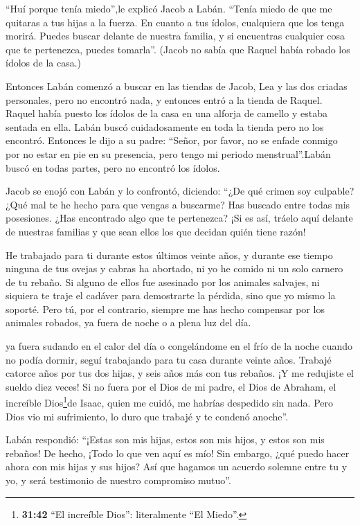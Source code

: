  ``Huí porque tenía miedo'',le explicó Jacob a Labán.
``Tenía miedo de que me quitaras a tus hijas a la fuerza. 
En cuanto a tus ídolos, cualquiera que los tenga morirá. Puedes buscar
delante de nuestra familia, y si encuentras cualquier cosa que te
pertenezca, puedes tomarla''. (Jacob no sabía que Raquel había robado
los ídolos de la casa.)

 Entonces Labán comenzó a buscar en las tiendas de Jacob,
Lea y las dos criadas personales, pero no encontró nada, y entonces
entró a la tienda de Raquel.  Raquel había puesto los
ídolos de la casa en una alforja de camello y estaba sentada en ella.
Labán buscó cuidadosamente en toda la tienda pero no los encontró.
 Entonces le dijo a su padre: ``Señor, por favor, no se
enfade conmigo por no estar en pie en su presencia, pero tengo mi
periodo menstrual''.Labán buscó en todas partes, pero no encontró los
ídolos.

 Jacob se enojó con Labán y lo confrontó, diciendo: ``¿De
qué crimen soy culpable? ¿Qué mal te he hecho para que vengas a
buscarme?  Has buscado entre todas mis posesiones. ¿Has
encontrado algo que te pertenezca? ¡Si es así, tráelo aquí delante de
nuestras familias y que sean ellos los que decidan quién tiene razón!

 He trabajado para ti durante estos últimos veinte años, y
durante ese tiempo ninguna de tus ovejas y cabras ha abortado, ni yo he
comido ni un solo carnero de tu rebaño.  Si alguno de ellos
fue asesinado por los animales salvajes, ni siquiera te traje el cadáver
para demostrarte la pérdida, sino que yo mismo la soporté. Pero tú, por
el contrario, siempre me has hecho compensar por los animales robados,
ya fuera de noche o a plena luz del día.

 ya fuera sudando en el calor del día o congelándome en el
frío de la noche cuando no podía dormir, seguí trabajando para tu casa
durante veinte años.  Trabajé catorce años por tus dos
hijas, y seis años más con tus rebaños. ¡Y me redujiste el sueldo diez
veces!  Si no fuera por el Dios de mi padre, el Dios de
Abraham, el increíble Dios\footnote{\textbf{31:42} ``El increíble
  Dios'': literalmente ``El Miedo''.}de Isaac, quien me cuidó, me
habrías despedido sin nada. Pero Dios vio mi sufrimiento, lo duro que
trabajé y te condenó anoche''.

 Labán respondió: ``¡Estas son mis hijas, estos son mis
hijos, y estos son mis rebaños! De hecho, ¡Todo lo que ven aquí es mío!
Sin embargo, ¿qué puedo hacer ahora con mis hijas y sus hijos?
 Así que hagamos un acuerdo solemne entre tu y yo, y será
testimonio de nuestro compromiso mutuo''.

